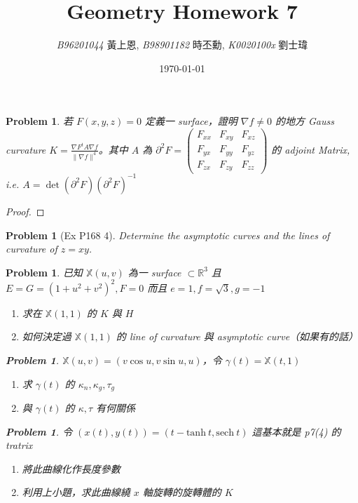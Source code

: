 \documentclass[10pt,a4paper]{article}
\newcommand{\LiHei}{\CJKfamily{lh}}
\newcounter{theProblemCounter}
\newtheorem{problem}[theProblemCounter]{Problem}
\begin{document}
\title{{Geometry Homework 7}}
\author{{\it{B96201044}} {\LiHei 黃上恩}, {\it{B98901182}} {\LiHei 時丕勳}, {\it{K0020100x}} {\LiHei 劉士瑋}}
\date{\today}
\maketitle

\newcommand{\bx}{\mathbb{X}}
\setcounter{theProblemCounter}{1}
\begin{problem}
若 $F(x, y, z)=0$ 定義一 surface，證明 $\nabla f\neq 0$ 的地方 Gauss curvature $K=\frac{\nabla F^t A\nabla f}{\|\nabla f\|^4}$。其中 $A$ 為 $\partial^2 F=\left(
\begin{array}{ccc}
F_{xx} & F_{xy} & F_{xz} \\
F_{yx} & F_{yy} & F_{yz} \\
F_{zx} & F_{zy} & F_{zz}\end{array}
\right)$ 的 adjoint Matrix, i.e. $A=\det(\partial^2F)(\partial^2F)^{-1}$
\end{problem}
\begin{proof} \end{proof}

\setcounter{theProblemCounter}{2}
\begin{problem}[Ex P168 4]
Determine the asymptotic curves and the lines of curvature of $z=xy$.
\end{problem}

\setcounter{theProblemCounter}{3}
\begin{problem}
已知 $\mathbb{X}(u, v)$ 為一 surface $\subset \mathbb{R}^3$ 且 $E=G=(1+u^2+v^2)^2, F=0$ 而且 $e=1, f=\sqrt{3}, g=-1$
\begin{enumerate}
\item[(a)] 求在 $\mathbb{X}(1, 1)$ 的 $K$ 與 $H$
\item[(b)] 如何決定過 $\mathbb{X}(1, 1)$ 的 line of curvature 與 asymptotic curve（如果有的話）
\end{enumerate}

\setcounter{theProblemCounter}{4}
\begin{problem}
$\mathbb{X}(u, v) = (v\cos u, v\sin u, u)$，令 $\gamma(t)=\mathbb{X}(t, 1)$
\begin{enumerate}
\item[(a)] 求 $\gamma(t)$ 的 $\kappa_n, \kappa_g, \tau_g$
\item[(b)] 與 $\gamma(t)$ 的 $\kappa, \tau$ 有何關係
\end{enumerate}
\end{problem}

\setcounter{theProblemCounter}{5}
\begin{problem}
令 $(x(t), y(t)) = (t-\mathrm{tanh\ } t, \mathrm{sech\ } t)$ 這基本就是 p7(4) 的 tratrix
\begin{enumerate}
\item[(a)] 將此曲線化作長度參數
\item[(b)] 利用上小題，求此曲線繞 $x$ 軸旋轉的旋轉體的 $K$
\end{enumerate}
\end{problem}

\end{problem}
\end{document}

